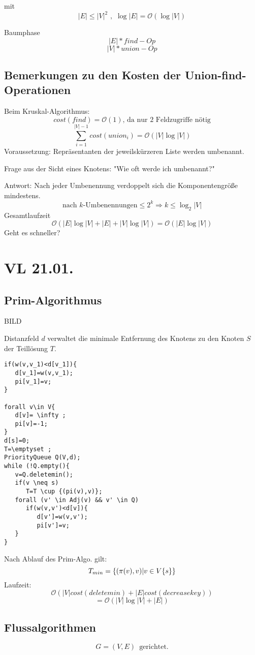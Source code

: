 \documentclass[a4paper,draft,twoside,10pt]{report}
\begin{document}
mit
\[|E|\leq |V|^2 \,\,,\,\, \log|E|=\mathcal O (\log |V|)\]

Baumphase
\[|E| * find-Op\]
\[|V| * union-Op\]

\section{Bemerkungen zu den Kosten der Union-find-Operationen}
Beim Kruskal-Algorithmus:
\[cost(find)= \mathcal O(1) \mbox{, da nur 2 Feldzugriffe nötig}\]
\[\sum^{|V|-1}_{i=1}cost(union_i)=\mathcal O(|V|\log |V|)\]
Voraussetzung: Repräsentanten der jeweilskürzeren Liste werden umbenannt.

Frage aus der Sicht eines Knotens:
"Wie oft werde ich umbenannt?"

Antwort: Nach jeder Umbenennung verdoppelt sich die Komponentengröße mindestens.
\[ \mbox{nach }k\mbox{-Umbenennungen}\le 2^k \Rightarrow k\le \log_2 |V|\]
Gesamtlaufzeit
\[\mathcal O(|E|\log|V|+|E|+|V|\log|V|)=\mathcal O(|E|\log|V|)\]
Geht es schneller?



\chapter{VL 21.01.}
\section{Prim-Algorithmus}

BILD

Distanzfeld $d$ verwaltet die minimale Entfernung des Knotens zu den Knoten $S$ der Teillösung $T$.

\begin{verbatim}
if(w(v,v_1)<d[v_1]){
   d[v_1]=w(v,v_1);
   pi[v_1]=v;
}

forall v\in V{
   d[v]= \infty ;
   pi[v]=-1;
}
d[s]=0;
T=\emptyset ;
PriorityQueue Q(V,d);
while (!Q.empty(){
   v=Q.deletemin();
   if(v \neq s)
      T=T \cup {(pi(v),v)};
   forall (v' \in Adj(v) && v' \in Q)
      if(w(v,v')<d[v]){
         d[v']=w(v,v');
         pi[v']=v;
   }
}
\end{verbatim}
Nach Ablauf des Prim-Algo. gilt:
\[T_{min}=\{(\pi(v),v)|v\in V\/\{s\}\}\]
Laufzeit:
\[\mathcal O(|V|cost(deletemin)+|E|cost(decreasekey))\]
\[= \mathcal O (|V|\log|V|+|E|)\]
\section{Flussalgorithmen}
\[G=(V,E)\,\,\,\mbox{gerichtet.}\]
\end{document}
